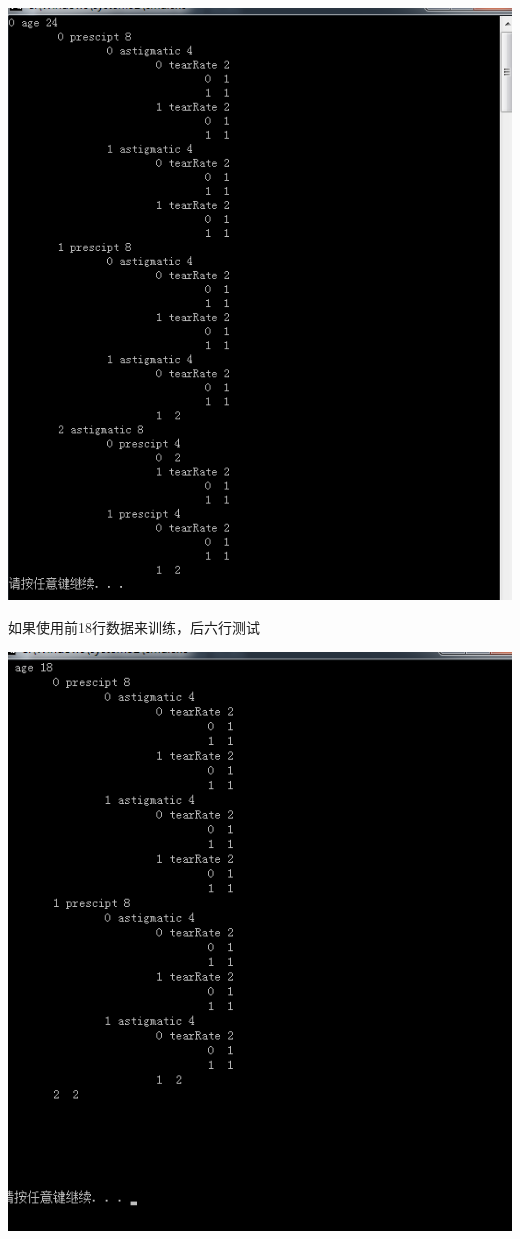 \documentclass[12pt,a4paper]{article}
\theoremstyle{definition}
\begin{document}
	\begin{center}
		\includegraphics[width=\textwidth]{C45all2train.png}
	\end{center}
	如果使用前18行数据来训练，后六行测试
	\begin{center}
		\includegraphics[width=\textwidth]{C18toTrain.png}
	\end{center}
\end{document}
